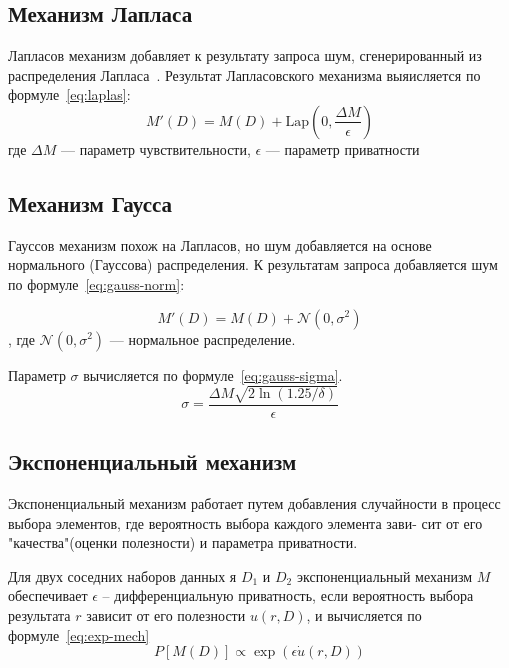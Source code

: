 \subsection{Механизм Лапласа}
Лапласов механизм добавляет к результату запроса шум, сгенерированный из распределения Лапласа~\cite{main}.
Результат Лапласовского механизма выяисляется по формуле~\ref{eq:laplas}:
\begin{equation}\label{eq:laplas}
	M'(D) = M(D) + \text{Lap}(0, \frac{\Delta M}{\epsilon})
\end{equation}
где $\Delta M$ --- параметр чувствительности, $\epsilon$ --- параметр приватности

\subsection{Механизм Гаусса} 
Гауссов механизм похож на Лапласов, но шум добавляется на основе нормального (Гауссова) распределения.
К результатам запроса добавляется шум по формуле~\ref{eq:gauss-norm}:

\begin{equation}\label{eq:gauss-norm}
	M'(D) = M(D) + \mathcal{N}(0, \sigma^2)
\end{equation}
, где $\mathcal{N}(0, \sigma^2)$ --- нормальное распределение.

Параметр $\sigma$ вычисляется по формуле~\ref{eq:gauss-sigma}.
\begin{equation}\label{eq:gauss-sigma}
	\sigma = \frac{\Delta M \sqrt{2 \ln(1.25/\delta)}}{\epsilon}
\end{equation}

\subsection{Экспоненциальный механизм}
Экспоненциальный механизм работает путем добавления случайности в
процесс выбора элементов, где вероятность выбора каждого элемента зави-
сит от его "качества"(оценки полезности) и параметра приватности.

Для двух соседних наборов данных я $D_1$ и $D_2$  экспоненциальный механизм $M$ обеспечивает $\epsilon$ -- дифференциальную приватность, если вероятность выбора результата $r$ зависит от его полезности $u(r, D)$, и вычисляется по формуле~\ref{eq:exp-mech}
\begin{equation}\label{eq:exp-mech}
	P[M(D)] \propto \exp(\epsilon \dot u(r, D))
\end{equation}

